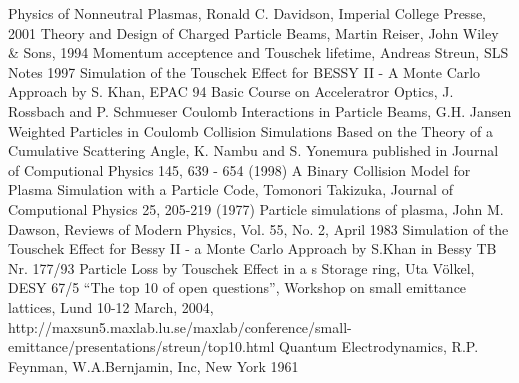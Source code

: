 \appendix
\begin{thebibliography}{77}	

 Physics of Nonneutral Plasmas, Ronald C. Davidson, Imperial College Presse, 2001 %
 Theory and Design of Charged Particle Beams, Martin Reiser, John Wiley \& Sons, 1994 %
 Momentum acceptence and Touschek lifetime, Andreas Streun, SLS Notes 1997 %
 Simulation of the Touschek Effect for BESSY II - A Monte Carlo Approach by S. Khan, EPAC 94 %
 Basic Course on Acceleratror Optics, J. Rossbach and P. Schmueser %
 Coulomb Interactions in Particle Beams, G.H. Jansen %
 Weighted Particles in Coulomb Collision Simulations Based on the Theory of a Cumulative Scattering Angle, K. Nambu and S. Yonemura published in Journal of Computional Physics 145, 639 - 654 (1998) %
 A Binary Collision Model for Plasma Simulation with a Particle Code, Tomonori Takizuka, Journal of Computional Physics 25, 205-219 (1977) %
 Particle simulations of plasma, John M. Dawson, Reviews of Modern Physics, Vol. 55, No. 2, April 1983 %
 Simulation of the Touschek Effect for Bessy II - a Monte Carlo Approach by S.Khan in Bessy TB Nr. 177/93 %
 Particle Loss by Touschek Effect in a s Storage ring, Uta V\"olkel, DESY 67/5 %
 ``The top 10 of open questions'', Workshop on small emittance lattices, Lund 10-12 March, 2004, http://maxsun5.maxlab.lu.se/maxlab/conference/small-emittance/presentations/streun/top10.html %
 Quantum Electrodynamics, R.P. Feynman, W.A.Bernjamin, Inc, New York 1961 %
\end{thebibliography}
